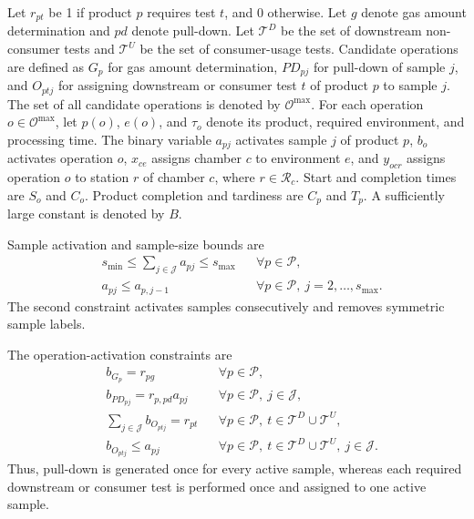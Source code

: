 \documentclass[11pt]{article}
\begin{document}
Let \(r_{pt}\) be 1 if product \(p\) requires test \(t\), and 0 otherwise. Let \(g\) denote gas amount determination and \(pd\) denote pull-down. Let \(\mathcal{T}^{D}\) be the set of downstream non-consumer tests and \(\mathcal{T}^{U}\) be the set of consumer-usage tests. Candidate operations are defined as \(G_p\) for gas amount determination, \(PD_{pj}\) for pull-down of sample \(j\), and \(O_{ptj}\) for assigning downstream or consumer test \(t\) of product \(p\) to sample \(j\). The set of all candidate operations is denoted by \(\mathcal{O}^{\max}\). For each operation \(o\in\mathcal{O}^{\max}\), let \(p(o)\), \(e(o)\), and \(\tau_o\) denote its product, required environment, and processing time. The binary variable \(a_{pj}\) activates sample \(j\) of product \(p\), \(b_o\) activates operation \(o\), \(x_{ce}\) assigns chamber \(c\) to environment \(e\), and \(y_{ocr}\) assigns operation \(o\) to station \(r\) of chamber \(c\), where \(r\in\mathcal{R}_c\). Start and completion times are \(S_o\) and \(C_o\). Product completion and tardiness are \(C_p\) and \(T_p\). A sufficiently large constant is denoted by \(B\).

Sample activation and sample-size bounds are
\begin{align}
& s_{\min}\le \sum_{j\in\mathcal{J}}a_{pj}\le s_{\max} && \forall p\in\mathcal{P},\\
& a_{pj}\le a_{p,j-1} && \forall p\in\mathcal{P},\ j=2,\ldots,s_{\max}.
\end{align}
The second constraint activates samples consecutively and removes symmetric sample labels.

The operation-activation constraints are
\begin{align}
& b_{G_p}=r_{pg} && \forall p\in\mathcal{P},\\
& b_{PD_{pj}}=r_{p,pd}a_{pj} && \forall p\in\mathcal{P},\ j\in\mathcal{J},\\
& \sum_{j\in\mathcal{J}} b_{O_{ptj}}=r_{pt} && \forall p\in\mathcal{P},\ t\in\mathcal{T}^{D}\cup\mathcal{T}^{U},\\
& b_{O_{ptj}}\le a_{pj} && \forall p\in\mathcal{P},\ t\in\mathcal{T}^{D}\cup\mathcal{T}^{U},\ j\in\mathcal{J}.
\end{align}
Thus, pull-down is generated once for every active sample, whereas each required downstream or consumer test is performed once and assigned to one active sample.
\end{document}
